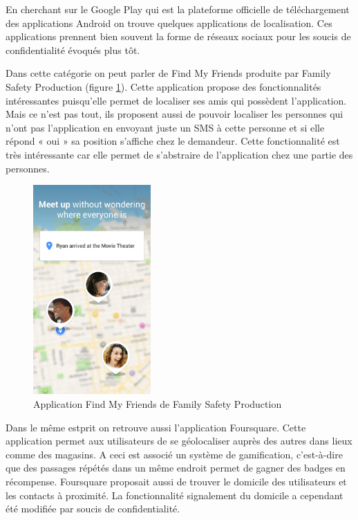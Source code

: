 En cherchant sur le Google Play qui est la plateforme officielle de téléchargement des applications Android on trouve quelques applications de localisation. Ces applications prennent bien souvent la forme de réseaux sociaux pour les soucis de confidentialité évoqués plus tôt.

Dans cette catégorie on peut parler de Find My Friends \cite{bibfindmyfriends} produite par Family Safety Production (figure \ref{findmyfriends}). Cette application propose des fonctionnalités intéressantes puisqu’elle permet de localiser ses amis qui possèdent l’application. Mais ce n’est pas tout, ils proposent aussi de pouvoir localiser les personnes qui n’ont pas l’application en envoyant juste un SMS à cette personne et si elle répond « oui » sa position s’affiche chez le demandeur. Cette fonctionnalité est très intéressante car elle permet de s’abstraire de l’application chez une partie des personnes.

\begin{figure}[H]
    \centering
    \includegraphics[height=8cm]{./img/findmyfriends.png}
    \caption{Application Find My Friends de Family Safety Production}
    \label{findmyfriends}
\end{figure}

Dans le même estprit on retrouve aussi l'application Foursquare. Cette application permet aux utilisateurs de se géolocaliser auprès des autres dans lieux comme des magasins. A ceci est associé un système de gamification, c'est-à-dire que des passages répétés dans un même endroit permet de gagner des badges en récompense. Foursquare proposait aussi de trouver le domicile des utilisateurs et les contacts à proximité. La fonctionnalité signalement du domicile a cependant été modifiée par soucis de confidentialité.

